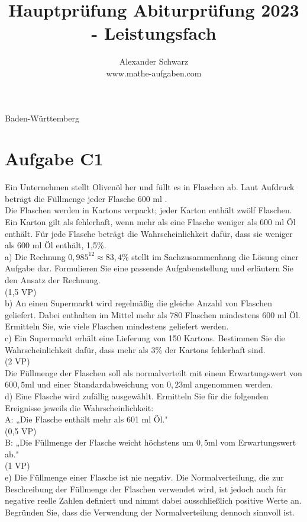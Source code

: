 \documentclass[10pt]{article}
\title{Hauptprüfung Abiturprüfung 2023 - Leistungsfach }
\author{Alexander Schwarz\\
www.mathe-aufgaben.com}
\date{}
\begin{document}
\maketitle
 Baden-Württemberg

\section*{Aufgabe C1}
Ein Unternehmen stellt Olivenöl her und füllt es in Flaschen ab. Laut Aufdruck beträgt die Füllmenge jeder Flasche 600 ml .\\
Die Flaschen werden in Kartons verpackt; jeder Karton enthält zwölf Flaschen. Ein Karton gilt als fehlerhaft, wenn mehr als eine Flasche weniger als 600 ml Öl enthält. Für jede Flasche beträgt die Wahrscheinlichkeit dafür, dass sie weniger als 600 ml Öl enthält, 1,5\%.\\
a) Die Rechnung $0,985^{12} \approx 83,4 \%$ stellt im Sachzusammenhang die Lösung einer Aufgabe dar. Formulieren Sie eine passende Aufgabenstellung und erläutern Sie den Ansatz der Rechnung.\\
(1,5 VP)\\
b) An einen Supermarkt wird regelmäßig die gleiche Anzahl von Flaschen geliefert. Dabei enthalten im Mittel mehr als 780 Flaschen mindestens 600 ml Öl. Ermitteln Sie, wie viele Flaschen mindestens geliefert werden.\\
c) Ein Supermarkt erhält eine Lieferung von 150 Kartons. Bestimmen Sie die Wahrscheinlichkeit dafür, dass mehr als 3\% der Kartons fehlerhaft sind.\\
(2 VP)\\
Die Füllmenge der Flaschen soll als normalverteilt mit einem Erwartungswert von $600,5 \mathrm{ml}$ und einer Standardabweichung von $0,23 \mathrm{ml}$ angenommen werden.\\
d) Eine Flasche wird zufällig ausgewählt. Ermitteln Sie für die folgenden Ereignisse jeweils die Wahrscheinlichkeit:\\
A: „Die Flasche enthält mehr als 601 ml Öl."\\
(0,5 VP)\\
B: „Die Füllmenge der Flasche weicht höchstens um $0,5 \mathrm{ml}$ vom Erwartungswert ab."\\
(1 VP)\\
e) Die Füllmenge einer Flasche ist nie negativ. Die Normalverteilung, die zur Beschreibung der Füllmenge der Flaschen verwendet wird, ist jedoch auch für negative reelle Zahlen definiert und nimmt dabei ausschließlich positive Werte an. Begründen Sie, dass die Verwendung der Normalverteilung dennoch sinnvoll ist.\\
\end{document}
